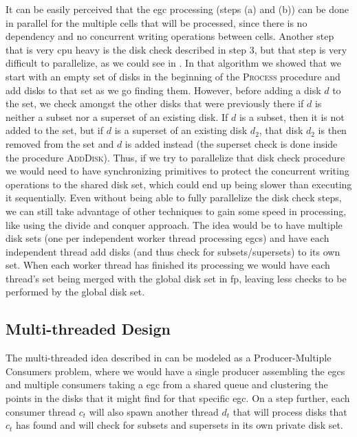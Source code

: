 It can be easily perceived that the \ac{egc} processing (steps (a) and (b)) can be done in parallel for the multiple
cells that will be processed, since there is no dependency and no concurrent writing operations between cells. Another
step that is very \ac{cpu} heavy is the disk check described in step 3, but that step is very difficult to parallelize,
as we could see in . In that algorithm we showed that we start with an empty set of disks in the
beginning of the \textsc{Process} procedure and add disks to that set as we go finding them. However, before adding a
disk $d$ to the set, we check amongst the other disks that were previously there if $d$ is neither a subset nor a
superset of an existing disk. If $d$ is a subset, then it is not added to the set, but if $d$ is a superset of an
existing disk $d_2$, that disk $d_2$ is then removed from the set and $d$ is added instead (the superset check is done
inside the procedure \textsc{AddDisk}). Thus, if we try to parallelize that disk check procedure we would need to have
synchronizing primitives to protect the concurrent writing operations to the shared disk set, which could end up being
slower than executing it sequentially. Even without being able to fully parallelize the disk check steps, we can still
take advantage of other techniques to gain some speed in processing, like using the divide and conquer approach. The
idea would be to have multiple disk sets (one per independent worker thread processing \acp{egc}) and have each
independent thread add disks (and thus check for subsets/supersets) to its own set. When each worker thread has finished
its processing we would have each thread's set being merged with the global disk set in \ac{fp}, leaving less checks to
be performed by the global disk set.

\subsection{Multi-threaded Design}
\label{subsec:multithread}
The multi-threaded idea described in  can be modeled as a Producer-Multiple Consumers problem,
where we would have a single producer assembling the \ac{egc}s and multiple consumers taking a \ac{egc} from a shared
queue and clustering the points in the disks that it might find for that specific \ac{egc}. On a step further, each
consumer thread $c_t$ will also spawn another thread $d_t$ that will process disks that $c_t$ has found and will check
for subsets and supersets in its own private disk set.

